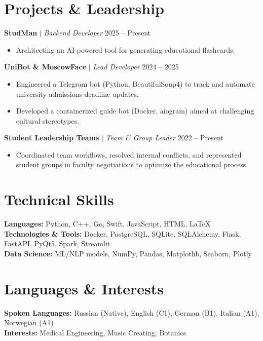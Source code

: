 \documentclass[10pt,a4paper]{article}
\begin{document}
\section{Projects \& Leadership}
\noindent
\textbf{StudMan} $|$ \textit{Backend Developer} \hfill 2025 -- Present
\begin{itemize}
    \item Architecting an AI-powered tool for generating educational flashcards.
\end{itemize}

\vspace{0.15cm}
\noindent
\textbf{UniBot \& MoscowFace} $|$ \textit{Lead Developer} \hfill 2024 -- 2025
\begin{itemize}
    \item Engineered a Telegram bot (Python, BeautifulSoup4) to track and automate university admissions deadline updates.
    \item Developed a containerized guide bot (Docker, aiogram) aimed at challenging cultural stereotypes.
\end{itemize}

\vspace{0.15cm}
\noindent
\textbf{Student Leadership Teams} $|$ \textit{Team \& Group Leader} \hfill 2022 -- Present
\begin{itemize}
    \item Coordinated team workflows, resolved internal conflicts, and represented student groups in faculty negotiations to optimize the educational process.
\end{itemize}

\section{Technical Skills}
\noindent
\textbf{Languages:} Python, C++, Go, Swift, JavaScript, HTML, LaTeX\\
\textbf{Technologies \& Tools:} Docker, PostgreSQL, SQLite, SQLAlchemy, Flask, FastAPI, PyQt5, Spark, Streamlit\\
\textbf{Data Science:} ML/NLP models, NumPy, Pandas, Matplotlib, Seaborn, Plotly

\section{Languages \& Interests}
\noindent
\textbf{Spoken Languages:} Russian (Native), English (C1), German (B1), Italian (A1), Norwegian (A1)\\
\textbf{Interests:} Medical Engineering, Music Creating, Botanics
\end{document}
